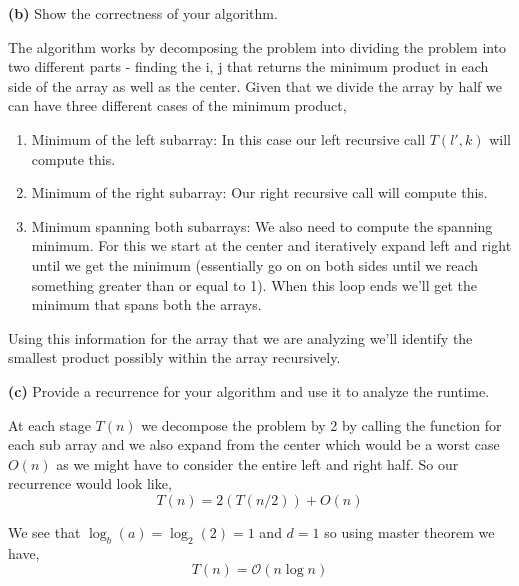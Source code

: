 \documentclass[12pt]{article}
\newcommand{\question}[3][Q]{
\begin{description}
\item \textbf{#1{#2}} #3
\end{description}
}
\newcommand{\bigO}{\mathcal{O}}
\begin{document}
\question[]{(b)}{
    Show the correctness of your algorithm.
}
\begin{answer}
    The algorithm works by decomposing the problem into dividing the problem into two different parts - finding the i, j that returns the minimum product in each side of the array as well as the center. Given that we divide the array by half we can have three different cases of the minimum product, 
    \begin{enumerate}
        \item  Minimum of the left subarray: In this case our left recursive call $T(l', k)$ will compute this.
        \item Minimum of the right subarray: Our right recursive call will compute this.
        \item Minimum spanning both subarrays: We also need to compute the spanning minimum. For this we start at the center and iteratively expand left and right until we get the minimum (essentially go on on both sides until we reach something greater than or equal to 1). When this loop ends we'll get the minimum that spans both the arrays.
    \end{enumerate}

    Using this information for the array that we are analyzing we'll identify the smallest product possibly within the array recursively. 
\end{answer}

\question[]{(c)}{
    Provide a recurrence for your algorithm and use it to analyze the runtime.
}
\begin{answer}
    At each stage $T(n)$ we decompose the problem by 2 by calling the function for each sub array and we also expand from the center which would be a worst case $O(n)$ as we might have to consider the entire left and right half. So our recurrence would look like, 
    $$ T(n) = 2(T(n /2)) + O(n) $$ 

    We see that $\log_b(a) = \log_2(2) = 1$ and  $d = 1 $ so using master theorem we have, 
    $$ T(n) = \bigO(n \log n) $$ 
\end{answer}
\end{document}
